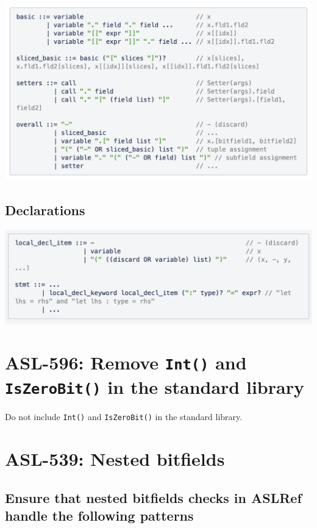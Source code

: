 \includegraphics[width=\textwidth]{lhs-multiple.png}

\subsection{Declarations}

\includegraphics[width=\textwidth]{lhs-declarations.png}

\section{ASL-596: Remove \texttt{Int()} and \texttt{IsZeroBit()} in the standard library}

Do not include \texttt{Int()} and \texttt{IsZeroBit()} in the standard library.

\section{ASL-539: Nested bitfields}

\subsection{Ensure that nested bitfields checks in ASLRef handle the following patterns}

